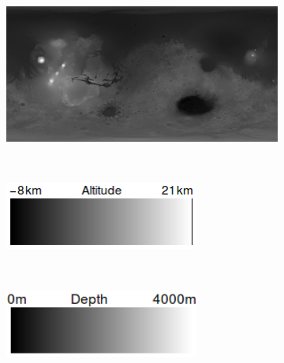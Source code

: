 \documentclass[12pt]{iopart}
\numberwithin{equation}{section}
\begin{document}
\begin{figure}
    \centering
    \begin{subfigure}[b]{1.0\textwidth}
        \includegraphics[width=\textwidth]{MOLAdata.png}
        \caption{}
        \label{fig:MOLAdata}
    \end{subfigure}

    ~ %
    \begin{subfigure}[b]{0.45\textwidth}
        \includegraphics[width=0.7\textwidth]{MOLAdatakey.png}
        \label{fig:MOLAdatakey}
    \end{subfigure}
    ~ %
    \begin{subfigure}[b]{0.45\textwidth}
        \includegraphics[width=0.7\textwidth]{Depthkey.png}
        \label{fig:Depthkey}
    \end{subfigure}


\end{figure}
\end{document}
